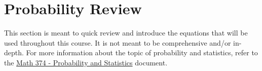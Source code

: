 \section{Probability Review}\label{sec:Probability_Review}
This section is meant to quick review and introduce the equations that will be used throughout this course.
It is not meant to be comprehensive and/or in-depth.
For more information about the topic of probability and statistics, refer to the \href{file:./Math_374-Reference_Sheet.pdf}{Math 374 - Probability and Statistics} document.

